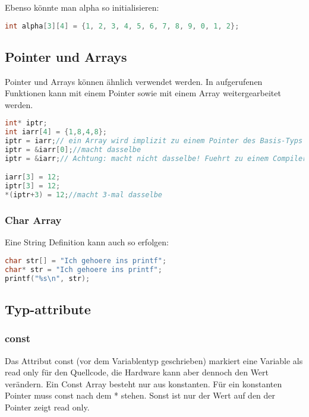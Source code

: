 Ebenso könnte man alpha so initialisieren:

\begin{lstlisting}[language = c]
int alpha[3][4] = {1, 2, 3, 4, 5, 6, 7, 8, 9, 0, 1, 2};
\end{lstlisting}

\subsection{Pointer und Arrays}

Pointer und Arrays können ähnlich verwendet werden. In aufgerufenen Funktionen kann mit einem Pointer sowie mit einem Array weitergearbeitet werden. 

\begin{lstlisting}[language = c]
int* iptr;
int iarr[4] = {1,8,4,8};
iptr = iarr;// ein Array wird implizit zu einem Pointer des Basis-Typs gewandelt
iptr = &iarr[0];//macht dasselbe
iptr = &iarr;// Achtung: macht nicht dasselbe! Fuehrt zu einem Compiler-Fehler!

iarr[3] = 12;
iptr[3] = 12;
*(iptr+3) = 12;//macht 3-mal dasselbe
\end{lstlisting}

\subsubsection{Char Array}

Eine String Definition kann auch so erfolgen:
\begin{lstlisting}[language = c]
char str[] = "Ich gehoere ins printf";
char* str = "Ich gehoere ins printf";
printf("%s\n", str);
\end{lstlisting}

\subsection{Typ-attribute}

\subsubsection{const}

Das Attribut const (vor dem Variablentyp geschrieben) markiert eine Variable als read only für den Quellcode, die Hardware kann aber dennoch den Wert verändern.\newline
Ein Const Array besteht nur aus konstanten.\newline
Für ein konstanten Pointer muss const nach dem * stehen. Sonst ist nur der Wert auf den der Pointer zeigt read only. 


